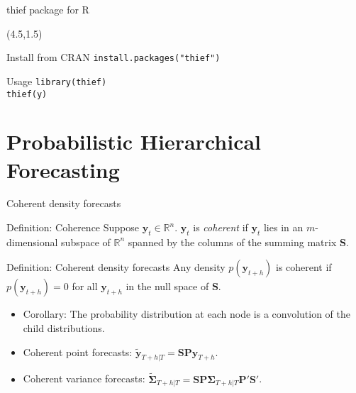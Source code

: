 \documentclass[14pt]{beamer}
\begin{document}
\begin{frame}{thief package for R}


\begin{textblock}{8}(4.5,1.5)
\end{textblock}\vspace*{3.6cm}\pause

\begin{block}{Install from CRAN}
  \texttt{install.packages("thief")}
\end{block}

\begin{alertblock}{Usage}
  \texttt{library(thief)}\\
  \texttt{thief(y)}
\end{alertblock}
\end{frame}


\section{Probabilistic Hierarchical Forecasting}

\begin{frame}{Coherent density forecasts}

\begin{block}{Definition: Coherence}
Suppose $\bm{y}_t\in\mathbb{R}^n$. $\bm{y}_t$ is \emph{coherent} if $\bm{y}_t$ lies in an $m$-dimensional subspace of $\mathbb{R}^n$ spanned by the columns of the summing matrix $\bm{S}$.
\end{block}\pause

\begin{block}{Definition: Coherent density forecasts}
Any density $p(\bm{y}_{t+h})$ is coherent if $p(\bm{y}_{t+h})=0$ for all $\bm{y}_{t+h}$ in the null space of $\bm{S}$.
\end{block}\pause

\begin{itemize}
  \item Corollary: The probability distribution at each node is a convolution of the child distributions.
  \item Coherent point forecasts: $\tilde{\bm{y}}_{T+h|T} = \bm{S}\bm{P}\hat{\bm{y}}_{T+h}$.
  \item Coherent variance forecasts:
  $\tilde{\bm{\Sigma}}_{T+h|T} = \bm{S}\bm{P}\hat{\bm{\Sigma}}_{T+h|T}\bm{P}'\bm{S}'$.
\end{itemize}

\end{frame}
\end{document}
